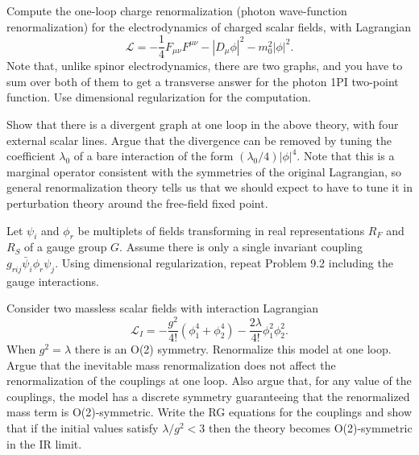 \begin{banksproblems}
Compute the one-loop charge renormalization (photon wave-function
renormalization) for the electrodynamics of charged scalar fields, with
Lagrangian
\[
  \mathcal{L}=-\frac14F_{\mu\nu}F^{\mu\nu}-|D_\mu\phi|^2-m_0^2|\phi|^2.
\]
Note that, unlike spinor electrodynamics, there are two graphs, and you have to
sum over both of them to get a transverse answer for the photon 1PI two-point
function. Use dimensional regularization for the computation.

Show that there is a divergent graph at one loop in the above theory, with four
external scalar lines. Argue that the divergence can be removed by tuning the
coefficient $\lambda_0$ of a bare interaction of the form
$(\lambda_0/4)|\phi|^4$. Note that this is a marginal operator consistent with
the symmetries of the original Lagrangian, so general renormalization theory
tells us that we should expect to have to tune it in perturbation theory around
the free-field fixed point.

Let $\psi_i$ and $\phi_r$ be multiplets of fields transforming in real
representations $R_F$ and $R_S$ of a gauge group $G$. Assume there is only a
single invariant coupling $g_{rij}\bar\psi_i\phi_r\psi_j$. Using dimensional
regularization, repeat Problem 9.2 including the gauge interactions.

Consider two massless scalar fields with interaction Lagrangian
\[
  \mathcal{L}_I=-\frac{g^2}{4!}(\phi_1^4+\phi_2^4)
  -\frac{2\lambda}{4!}\phi_1^2\phi_2^2.
\]
When $g^2=\lambda$ there is an O(2) symmetry. Renormalize this model at one
loop. Argue that the inevitable mass renormalization does not affect the
renormalization of the couplings at one loop. Also argue that, for any value of
the couplings, the model has a discrete symmetry guaranteeing that the
renormalized mass term is O(2)-symmetric. Write the RG equations for the
couplings and show that if the initial values satisfy $\lambda/g^2<3$ then the
theory becomes O(2)-symmetric in the IR limit.


\end{banksproblems}
